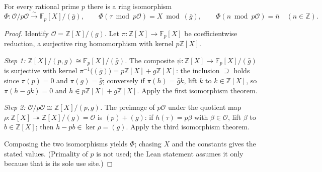 \begin{lemma}
  \label{prop-3-2-1-quot-iso}
  For every rational prime $p$ there is a ring isomorphism
  \[
    \Phi \colon \mathcal{O}/p\mathcal{O} \xrightarrow{\ \sim\ }
    \mathbb{F}_p[X]/(\bar g),
    \qquad
    \Phi(\tau \bmod p\mathcal{O}) = X \bmod (\bar g),
    \qquad
    \Phi(n \bmod p\mathcal{O}) = \bar n \quad (n \in \mathbb{Z}).
  \]
\end{lemma}

\begin{proof}
  Identify $\mathcal{O} = \mathbb{Z}[X]/(g)$. Let
  $\pi \colon \mathbb{Z}[X] \to \mathbb{F}_p[X]$ be coefficientwise
  reduction, a surjective ring homomorphism with kernel $p\mathbb{Z}[X]$.

  \emph{Step 1: $\mathbb{Z}[X]/(p, g) \cong \mathbb{F}_p[X]/(\bar g)$.}
  The composite $\psi \colon \mathbb{Z}[X] \to \mathbb{F}_p[X]/(\bar g)$ is
  surjective with kernel $\pi^{-1}\big((\bar g)\big) = p\mathbb{Z}[X] +
  g\mathbb{Z}[X]$: the inclusion $\supseteq$ holds since $\pi(p) = 0$ and
  $\pi(g) = \bar g$; conversely if $\pi(h) = \bar g \bar k$, lift $\bar k$ to
  $k \in \mathbb{Z}[X]$, so $\pi(h - gk) = 0$ and $h \in p\mathbb{Z}[X] +
  g\mathbb{Z}[X]$. Apply the first isomorphism theorem.

  \emph{Step 2: $\mathcal{O}/p\mathcal{O} \cong \mathbb{Z}[X]/(p, g)$.}
  The preimage of $p\mathcal{O}$ under the quotient map $\rho \colon
  \mathbb{Z}[X] \twoheadrightarrow \mathbb{Z}[X]/(g) = \mathcal{O}$ is
  $(p) + (g)$: if $h(\tau) = p\beta$ with $\beta \in \mathcal{O}$, lift
  $\beta$ to $b \in \mathbb{Z}[X]$; then $h - pb \in \ker\rho = (g)$. Apply
  the third isomorphism theorem.

  Composing the two isomorphisms yields $\Phi$; chasing $X$ and the constants
  gives the stated values. (Primality of $p$ is not used; the Lean statement
  assumes it only because that is its sole use site.)
\end{proof}

